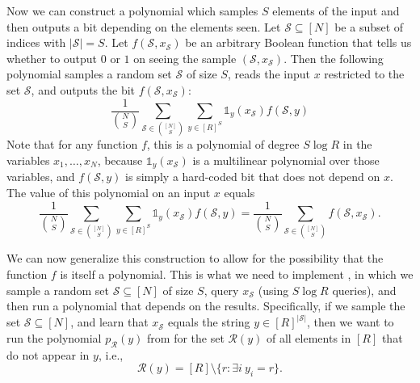 \documentclass[11pt, letterpaper, fleqn]{article}
\theoremstyle{plain}
\newcommand{\id}{{\mathds{1}}}
\newcommand{\Rcal}{\mathcal{R}}
\newcommand{\Scal}{\mathcal{S}}
\begin{document}
Now we can construct a polynomial which samples $S$ elements of the input and then outputs a bit depending on the elements seen. Let $\Scal \subseteq [N]$ be a subset of indices with $|\Scal|=S$. 
Let $f(\Scal,x_\Scal)$ be an arbitrary Boolean function that tells us whether to output $0$ or $1$ on seeing the sample $(\Scal,x_\Scal)$.
Then the following polynomial samples a random set $\Scal$ of size $S$, reads the input $x$ restricted to the set $\Scal$, and outputs the bit $f(\Scal,x_\Scal)$:
\begin{equation}
    \frac{1}{\binom{N}{S}} \sum_{\Scal \in \binom{[N]}{S}} \sum_{y \in [R]^S} \id_y(x_\Scal) f(\Scal,y)
\end{equation}
Note that for any function $f$, this is a polynomial of degree $S\log R$  in the variables $x_1,\ldots,x_N$, because $\id_y(x_\Scal)$ is a multilinear polynomial over those variables, and $f(\Scal,y)$ is simply a hard-coded bit that does not depend on $x$. The value of this polynomial on an input $x$ equals
\begin{equation}
    \frac{1}{\binom{N}{S}} \sum_{\Scal \in \binom{[N]}{S}} \sum_{y \in [R]^S} \id_y(x_\Scal) f(\Scal,y)  
    = \frac{1}{\binom{N}{S}} \sum_{\Scal \in \binom{[N]}{S}} f(\Scal,x_\Scal).
\end{equation}

We can now generalize this construction to allow for the possibility that the function $f$ is itself a polynomial. 
This is what we need to implement , in which we sample a random set $\Scal \subseteq [N]$ of size $S$, query $x_{\mathcal{S}}$ (using $S \log R$ queries), and then run a polynomial that depends on the results.
Specifically, if we sample the set $\Scal \subseteq [N]$, and learn that $x_{\mathcal{S}}$ equals the string $y\in[R]^{|\Scal|}$, then we want to run the polynomial $p_\Rcal(y)$ from  for the set $\Rcal(y)$ of all elements in $[R]$ that do not appear in $y$, i.e., 
\begin{equation} \label{nomoreeqs}
    \Rcal(y) = [R] \setminus \{r:\exists i~y_i = r\}.
\end{equation}
\end{document}
